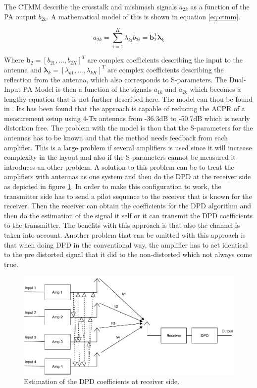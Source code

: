 The CTMM describe the crosstalk and mishmash signals $a_{2k}$ as a function of the PA output $b_{2k}$. A mathematical model of this is shown in equation \ref{eq:ctmm}.

\begin{equation} \label{eq:ctmm}
 a_{2k} = \sum_{i=1}^{K} \lambda_{ki} b_{2i} = \boldsymbol{b}_2^T \boldsymbol{\lambda}_k
\end{equation}

Where $\boldsymbol{b}_2 = [b_{21},...,b_{2K}]^T$ are complex coefficients describing the input to the antenna and $\boldsymbol{\lambda}_k = [\lambda_{k1},...,\lambda_{kK}]^T$ are complex coefficients describing the reflection from the antenna, which also corresponds to S-parameters. The Dual-Input PA Model is then a function of the signals $a_{1k}$ and $a_{2k}$ which becomes a lengthy equation that is not further described here. The model can thou be found in \citep{Hausmair2017}. Its has been found that the approach is capable of reducing the ACPR of a measurement setup using 4-Tx antennas from -36.3dB to -50.7dB which is nearly distortion free. The problem with the model is thou that the S-parameters for the antennas has to be known and that the method needs feedback from each amplifier. This is a large problem if several amplifiers is used since it will increase complexity in the layout and also if the S-parameters cannot be measured it introduces an other problem. A solution to this problem can be to treat the amplifiers with antennas as one system and then do the DPD at the receiver side as depicted in figure \ref{fig:dpd_pdpd}. In order to make this configuration to work, the transmitter side has to send a pilot sequence to the receiver that is known for the receiver. Then the receiver can obtain the coefficients for the DPD algorithm and then do the estimation of the signal it self or it can transmit the DPD coefficients to the transmitter. The benefits with this approach is that also the channel is taken into account. Another problem that can be omitted with this approach is that when doing DPD in the conventional way, the amplifier has to act identical to the pre distorted signal that it did to the non-distorted which not always come true.  

 
\begin{figure}[H]
\centering 
\includegraphics[scale = 0.7]{figures/ch1/postDPD.pdf}
\caption{Estimation of the DPD coefficients at receiver side. }
\label{fig:dpd_pdpd}
\end{figure}
























